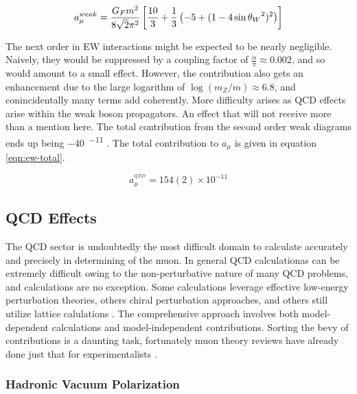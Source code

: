 \begin{equation}
\label{eqn:weak-lowest-order}
a_\mu^{weak} = \frac{G_F m^2}{8\sqrt{2}\pi^2} \\
\left[\frac{10}{3} + \frac{1}{3} \left(-5 + (1 - 4\sin{\theta_W}^2)^2 \right) \right]
\end{equation}

The next order in EW interactions might be expected to be nearly negligible.  Naively, they would be suppressed by a coupling factor of $\frac{\alpha}{\pi} \approx 0.002$, and so would amount to a small effect.  However, the contribution also gets an enhancement due to the large logarithm of $\log(m_Z/m) \approx 6.8$, and conincidentally many terms add coherently.  More difficulty arises as QCD effects arise within the weak boson propagators.  An effect that will not receive more than a mention here.  The total contribution from the second order weak diagrams ends up being \SI{-40}{^{-11}} \cite{the-muon-g-2}.  The total contribution to $a_\mu$ is given in equation \ref{eqn:ew-total}. 

\begin{equation}
\label{eqn:ew-total}
a_\mu^{^{QED}} = 154(2) \times 10^{-11}
\end{equation}

\subsection{QCD Effects} \label{s-sec:theory-qcd}

The QCD sector is undoubtedly the most difficult domain to calculate accurately and precisely in determining \gmtwo of the muon.  In general QCD calculationas can be extremely difficult owing to the non-perturbative nature of many QCD problems, and \mugmtwo calculations are no exception.  Some calculations leverage effective low-energy perturbation theories, others chiral perturbation approaches, and others still utilize lattice calulations \cite{the-muon-g-2}.  The comprehensive approach involves both model-dependent calculations and model-independent contributions.  Sorting the bevy of contributions is a daunting task, fortunately muon \gmtwo theory reviews have already done just that for experimentalists \cite{the-muon-g-2, a-mu-harbinger, muon-g-2-blum, muon-g-2-hadronic-jegerlehner}.

\subsubsection{Hadronic Vacuum Polarization}

